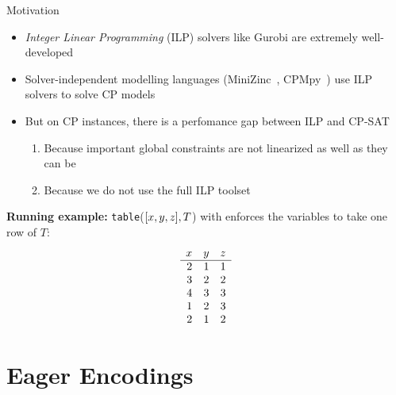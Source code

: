 \documentclass[aspectratio=169]{beamer}
\begin{document}
\begin{frame}{Motivation}

\begin{itemize}
	\item \textit{Integer Linear Programming} (ILP) solvers like Gurobi are extremely well-developed
	\item Solver-independent modelling languages (\eg MiniZinc~\cite{minizinc}, CPMpy~\cite{guns2019increasing}) use ILP solvers to solve CP models
    \item But on CP instances, there is a perfomance gap between ILP and \eg CP-SAT
    \begin{enumerate}
	    \item Because important global constraints are not linearized as well as they can be
	    \item Because we do not use the full ILP toolset
    \end{enumerate}
\end{itemize}


\medskip
	\textbf{Running example:} \texttt{table}($[\x{1}, \x{2}, \x{3}], T$) with enforces the variables to take one row of $T$:
\[
\begin{array}{rrr}
\x{1} & \x{2} & \x{3} \\ \hline
2 & 1 & 1 \\
3 & 2 & 2 \\
4 & 3 & 3 \\
1 & 2 & 3 \\
2 & 1 & 2
\end{array}
\]
\end{frame}

\section{Eager Encodings}
\end{document}
